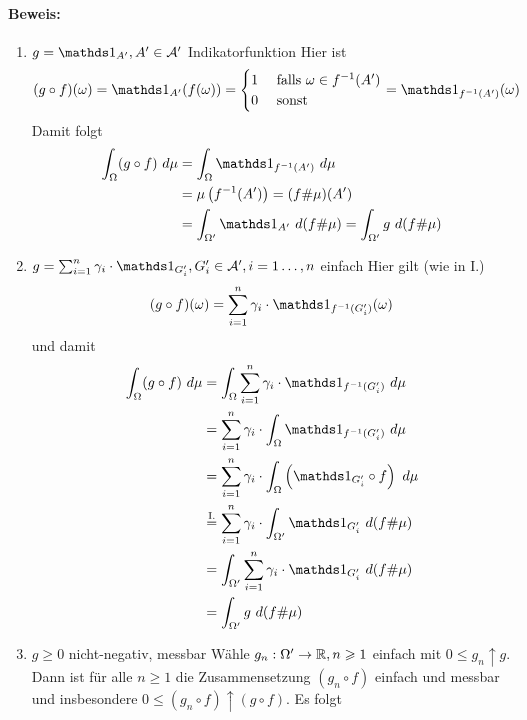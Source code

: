  \paragraph{Beweis:}
 \begin{enumerate}[label=\Roman*.]
     \item $g=\ind{A'},A'\in\A'$ Indikatorfunktion\newline
     Hier ist 
     \begin{align*}
         (g\circ f)(\omega)=\ind{A'}(f(\omega))=
         \begin{cases}
             1&\text{ falls }\omega\in f^{-1}(A')\\
             0&\text{ sonst}
         \end{cases}
         =\ind{f^{-1}(A')}(\omega)
     \end{align*}
     Damit folgt
     \begin{align*}
         \int_{\Omega}(g\circ f)\ d\mu&=\int_{\Omega}\ind{f^{-1}(A')}\ d\mu\\
         &=\mu\left(f^{-1}(A')\right)=(f\#\mu)(A')\\
         &=\int_{\Omega'}\ind{A'}\ d(f\#\mu)=\int_{\Omega'}g\ d(f\#\mu)
     \end{align*}
     \item $g=\sum_{i=1}^n\gamma_i\cdot\ind{G_i'},G_i'\in\A',i=1\hdots,n$ einfach\newline
     Hier gilt (wie in I.) 
     $$(g\circ f)(\omega)=\sum_{i=1}^n\gamma_i\cdot\ind{f^{-1}(G_i')}(\omega)$$
     und damit 
     \begin{align*}
         \int_{\Omega}(g\circ f)\ d\mu&=\int_{\Omega}\sum_{i=1}^n\gamma_i\cdot\ind{f^{-1}(G_i')}\ d\mu\\
         &=\sum_{i=1}^n\gamma_i\cdot\int_{\Omega}\ind{f^{-1}(G_i')}\ d\mu\\
         &=\sum_{i=1}^n\gamma_i\cdot\int_{\Omega}\left(\ind{G_i'}\circ f\right)\ d\mu\\
         &\overset{\text{I.}}{=}\sum_{i=1}^n\gamma_i\cdot\int_{\Omega'}\ind{G_i'}\ d(f\#\mu)\\
         &=\int_{\Omega'}\sum_{i=1}^n\gamma_i\cdot\ind{G_i'}\ d(f\#\mu)\\
         &=\int_{\Omega'}g\ d(f\#\mu)
     \end{align*}
     \item $g\geq 0$ nicht-negativ, messbar\newline
     W\"ahle $g_n:\Omega'\to\mathbb{R},n\geqslant1$ einfach mit $0\leq g_n\uparrow g$. Dann ist f\"ur alle $n\geq1$ die Zusammensetzung $(g_n\circ f)$ einfach und messbar und insbesondere $0\leq (g_n\circ f)\uparrow (g\circ f)$. Es folgt

\end{enumerate}
